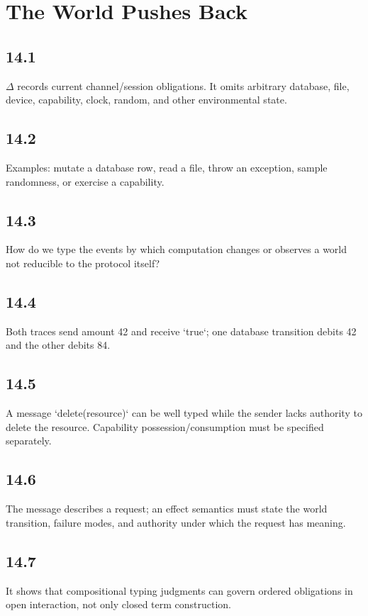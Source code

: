 \chapter{The World Pushes Back}

\section*{14.1}
$\Delta$ records current channel/session obligations. It omits arbitrary database, file, device, capability, clock, random, and other environmental state.

\section*{14.2}
Examples: mutate a database row, read a file, throw an exception, sample randomness, or exercise a capability.

\section*{14.3}
How do we type the events by which computation changes or observes a world not reducible to the protocol itself?

\section*{14.4}
Both traces send amount 42 and receive `true`; one database transition debits 42 and the other debits 84.

\section*{14.5}
A message `delete(resource)` can be well typed while the sender lacks authority to delete the resource. Capability possession/consumption must be specified separately.

\section*{14.6}
The message describes a request; an effect semantics must state the world transition, failure modes, and authority under which the request has meaning.

\section*{14.7}
It shows that compositional typing judgments can govern ordered obligations in open interaction, not only closed term construction.

